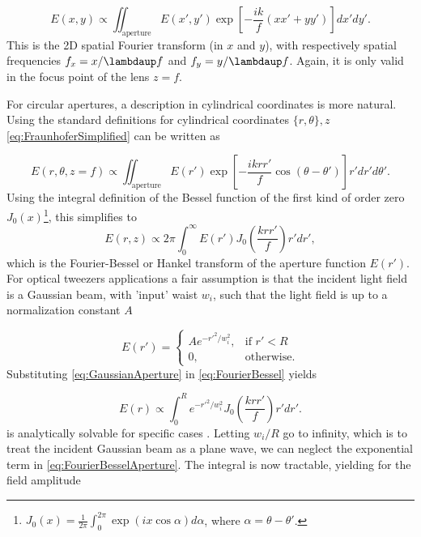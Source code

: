 \begin{mdframed}
    \begin{equation}\label{eq:FraunhoferSimplified}
        E(x,y) \propto 
        \iint_{\text{aperture}} E(x',y') \exp{\left[- \frac{ik}{f}(xx'+yy')\right]}dx'dy'.
    \end{equation}
     This is the 2D spatial Fourier transform (in $x$ and $y$), with respectively spatial frequencies $f_x = x/\lambdaup f$ and $f_y = y/\lambdaup f$. Again, it is only valid in the focus point of the lens $z=f$.
\end{mdframed}

\noindent For circular apertures, a description in cylindrical coordinates is more natural. 
Using the standard definitions for cylindrical coordinates $\{r,\theta\},z$ \cref{eq:FraunhoferSimplified} can be written as

\begin{equation}\label{eq:FraunhoferRTheta}
    E(r,\theta, z=f) \propto \iint_{\text{aperture}} E(r') \exp{\left[
    -\frac{i k r r'}{f} \cos{(\theta-\theta')} 
    \right]}r'dr'd\theta'.
\end{equation}
Using the integral definition of the Bessel function of the first kind of order zero $J_0(x)$\footnote{$J_0(x) = \frac{1}{2\pi} \int_0^{2\pi} \exp{(i x \cos{\alpha})} d\alpha$, where $\alpha=\theta-\theta'$.}, this simplifies to
\begin{equation}\label{eq:FourierBessel}
    E(r,z) \propto 2\pi \int_0^{\infty} E(r') J_0\left( \frac{k r r'}{f}\right) r'dr',
\end{equation}
which is the Fourier-Bessel or Hankel transform of the aperture function $E(r')$.
For optical tweezers applications a fair assumption is that the incident light field is a Gaussian beam, with 'input' waist $w_i$, such that the light field is up to a normalization constant $A$

\begin{equation}\label{eq:GaussianAperture}
    E(r')=
    \begin{cases}
        A e^{- r'^2/w_i^2},& \text{if } r' < R\\
        0,               & \text{otherwise}.
    \end{cases}
\end{equation}
Substituting \cref{eq:GaussianAperture} in \cref{eq:FourierBessel} yields

\begin{equation}\label{eq:FourierBesselAperture}
    E(r) \propto \int_0^R e^{-r'^2/w_i^2} J_0\left(\frac{k r r'}{f}\right)r'dr'.
\end{equation}
 is analytically solvable for specific cases \cite{Madjarov2020}.
Letting $w_i/R$ go to infinity, which is to treat the incident Gaussian beam as a plane wave, we can neglect the exponential term in \cref{eq:FourierBesselAperture}. 
The integral is now tractable, yielding for the field amplitude

